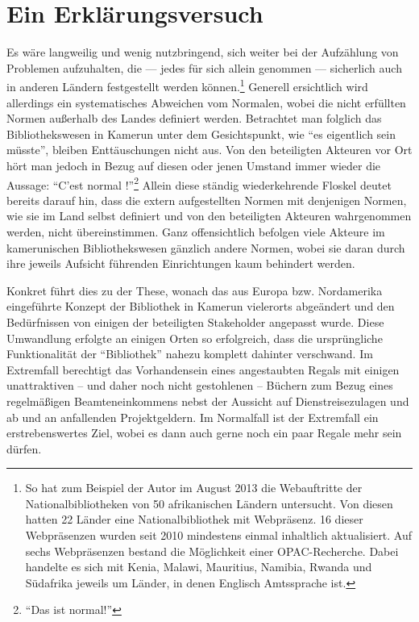 \documentclass[a4paper,
fontsize=11pt,
oneside,
numbers=noperiodatend,
parskip=half-,
bibliography=totoc,
final
]{scrartcl}
\begin{document}
\section*{Ein Erklärungsversuch}\label{ein-erkluxe4rungsversuch}

Es wäre langweilig und wenig nutzbringend, sich weiter bei der
Aufzählung von Problemen aufzuhalten, die --- jedes für sich allein
genommen --- sicherlich auch in anderen Ländern festgestellt werden
können.\footnote{So hat zum Beispiel der Autor im August 2013 die
  Webauftritte der Nationalbibliotheken von 50 afrikanischen Ländern
  untersucht. Von diesen hatten 22 Länder eine Nationalbibliothek mit
  Webpräsenz. 16 dieser Webpräsenzen wurden seit 2010 mindestens einmal
  inhaltlich aktualisiert. Auf sechs Webpräsenzen bestand die
  Möglichkeit einer OPAC-Recherche. Dabei handelte es sich mit Kenia,
  Malawi, Mauritius, Namibia, Rwanda und Südafrika jeweils um Länder, in
  denen Englisch Amtssprache ist.} Generell ersichtlich wird allerdings
ein systematisches Abweichen vom Normalen, wobei die nicht erfüllten
Normen außerhalb des Landes definiert werden. Betrachtet man folglich
das Bibliothekswesen in Kamerun unter dem Gesichtspunkt, wie \enquote{es
eigentlich sein müsste}, bleiben Enttäuschungen nicht aus. Von den
beteiligten Akteuren vor Ort hört man jedoch in Bezug auf diesen oder
jenen Umstand immer wieder die Aussage: \enquote{C'est normal
!}\footnote{\enquote{Das ist normal!}} Allein diese ständig
wiederkehrende Floskel deutet bereits darauf hin, dass die extern
aufgestellten Normen mit denjenigen Normen, wie sie im Land selbst
definiert und von den beteiligten Akteuren wahrgenommen werden, nicht
übereinstimmen. Ganz offensichtlich befolgen viele Akteure im
kamerunischen Bibliothekswesen gänzlich andere Normen, wobei sie daran
durch ihre jeweils Aufsicht führenden Einrichtungen kaum behindert
werden.

Konkret führt dies zu der These, wonach das aus Europa bzw. Nordamerika
eingeführte Konzept der Bibliothek in Kamerun vielerorts abgeändert und
den Bedürfnissen von einigen der beteiligten Stakeholder angepasst
wurde. Diese Umwandlung erfolgte an einigen Orten so erfolgreich, dass
die ursprüngliche Funktionalität der \enquote{Bibliothek} nahezu
komplett dahinter verschwand. Im Extremfall berechtigt das Vorhandensein
eines angestaubten Regals mit einigen unattraktiven -- und daher noch
nicht gestohlenen -- Büchern zum Bezug eines regelmäßigen
Beamteneinkommens nebst der Aussicht auf Dienstreisezulagen und ab und
an anfallenden Projektgeldern. Im Normalfall ist der Extremfall ein
erstrebenswertes Ziel, wobei es dann auch gerne noch ein paar Regale
mehr sein dürfen.
\end{document}
